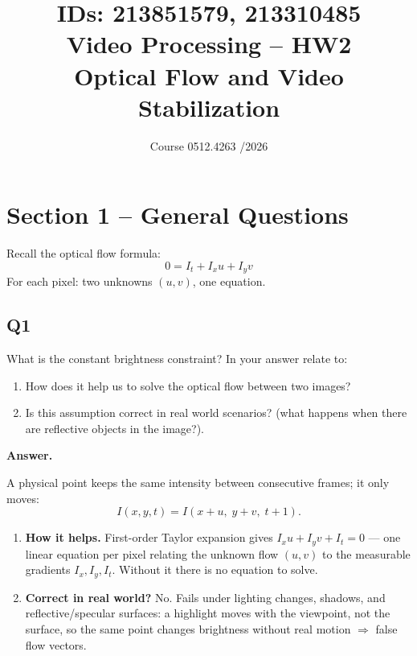 \documentclass[11pt]{article}
\title{
    \normalsize IDs: 213851579, 213310485 \\[1em]
    \huge Video Processing -- HW2 \\
    \large Optical Flow and Video Stabilization
}
\author{}
\date{Course 0512.4263 \quad 2025/2026}
\begin{document}
\maketitle

\section*{Section 1 -- General Questions}

Recall the optical flow formula:
\[
0 = I_t + I_x u + I_y v
\]
For each pixel: two unknowns $(u, v)$, one equation.

\subsection*{Q1}

What is the constant brightness constraint? In your answer relate to:
\begin{enumerate}[label=\alph*.]
    \item How does it help us to solve the optical flow between two images?
    \item Is this assumption correct in real world scenarios? (what happens when there are reflective objects in the image?).
\end{enumerate}

\noindent\textbf{Answer.}

\medskip
\noindent
A physical point keeps the same intensity between consecutive frames; it only moves:
\[
I(x, y, t) = I(x + u,\; y + v,\; t + 1).
\]

\begin{enumerate}[label=\alph*.]
    \item \textbf{How it helps.} First-order Taylor expansion gives
    $I_x u + I_y v + I_t = 0$ --- one linear equation per pixel relating the unknown
    flow $(u,v)$ to the measurable gradients $I_x, I_y, I_t$. Without it there is no
    equation to solve.

    \item \textbf{Correct in real world?} No. Fails under lighting changes, shadows,
    and reflective/specular surfaces: a highlight moves with the viewpoint, not the
    surface, so the same point changes brightness without real motion $\Rightarrow$
    false flow vectors.
\end{enumerate}
\end{document}

